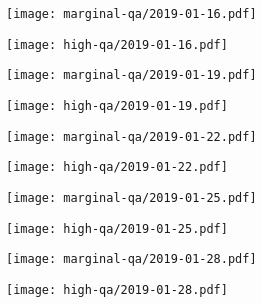\documentclass{article}
\begin{document}
\begin{figure}[H]
	\ContinuedFloat
	\centering
	\begin{subfigure}{0.48\linewidth}
		\texttt{[image: marginal-qa/2019-01-16.pdf]}
	\end{subfigure}
	\begin{subfigure}{0.48\linewidth}
		\texttt{[image: high-qa/2019-01-16.pdf]}
	\end{subfigure}
	\begin{subfigure}{0.48\linewidth}
		\texttt{[image: marginal-qa/2019-01-19.pdf]}
	\end{subfigure}
	\begin{subfigure}{0.48\linewidth}
		\texttt{[image: high-qa/2019-01-19.pdf]}
	\end{subfigure}
	\begin{subfigure}{0.48\linewidth}
		\texttt{[image: marginal-qa/2019-01-22.pdf]}
	\end{subfigure}
	\begin{subfigure}{0.48\linewidth}
		\texttt{[image: high-qa/2019-01-22.pdf]}
	\end{subfigure}
	\begin{subfigure}{0.48\linewidth}
		\texttt{[image: marginal-qa/2019-01-25.pdf]}
	\end{subfigure}
	\begin{subfigure}{0.48\linewidth}
		\texttt{[image: high-qa/2019-01-25.pdf]}
	\end{subfigure}
	\begin{subfigure}{0.48\linewidth}
		\texttt{[image: marginal-qa/2019-01-28.pdf]}
	\end{subfigure}
	\begin{subfigure}{0.48\linewidth}
		\texttt{[image: high-qa/2019-01-28.pdf]}
	\end{subfigure}
\end{figure}
\end{document}
